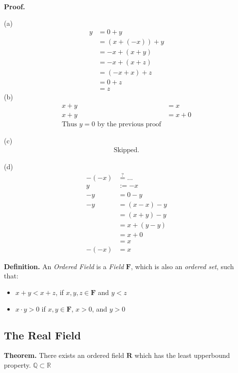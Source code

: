 \documentclass{article}
\newcommand{\qeq}{\stackrel{?}{=}}
\begin{document}
{\bf Proof.}

(a)
\begin{align*}
	y		& = 0 + y					\\
			& = (x + (-x)) + y\\
			& = -x + (x + y)	\\
			& = -x + (x + z)	\\
			& = (-x + x) + z	\\
			& = 0 + z					\\
			& = z
\end{align*}
(b)
\begin{align*}
	x + y		& = x				\\
	x + y		& = x + 0		\\
	\text{Thus } y = 0 \text{ by the previous proof}
\end{align*}

(c)
\begin{align*}
	\text{Skipped.}
\end{align*}

(d)
\begin{align*}
	-(-x) & \qeq \dots		\\
	y 		& := -x					\\
	-y		& = 0 - y				\\ 
	-y		& = (x - x) - y \\
				& = (x + y) - y	\\
				& = x + (y - y)	\\
				& = x + 0				\\
				& = x						\\
	-(-x)	& = x		
\end{align*}


\pagebreak

{\noindent\bf Definition.}
	An \emph{Ordered Field} is a \emph{Field} $\mathbf{F}$, which is also an \emph{ordered set}, such that:
	\begin{itemize}
		\item $x + y < x + z$, if $x, y, z \in \mathbf{F}$ and $y < z$
		\item $x \cdot y > 0$ if $x, y \in \mathbf{F}$, $x > 0$, and $y > 0$
	\end{itemize}


\subsection{The Real Field}

{\noindent\bf Theorem.}
	There exists an ordered field $\mathbf{R}$ which has the least upperbound property.
	$\mathbb{Q} \subset \mathbb{R}$
	
\end{document}

